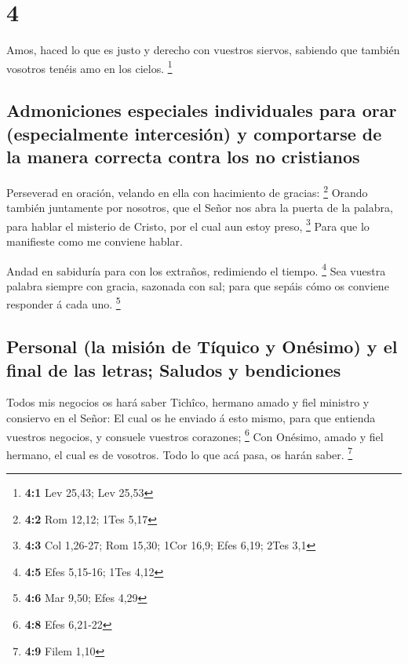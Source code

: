 \hypertarget{section-3}{%
\section{4}\label{section-3}}

 Amos, haced lo que es justo y derecho con vuestros siervos,
sabiendo que también vosotros tenéis amo en los cielos. \footnote{\textbf{4:1}
  Lev 25,43; Lev 25,53}

\hypertarget{admoniciones-especiales-individuales-para-orar-especialmente-intercesiuxf3n-y-comportarse-de-la-manera-correcta-contra-los-no-cristianos}{%
\subsection{Admoniciones especiales individuales para orar
(especialmente intercesión) y comportarse de la manera correcta contra
los no
cristianos}\label{admoniciones-especiales-individuales-para-orar-especialmente-intercesiuxf3n-y-comportarse-de-la-manera-correcta-contra-los-no-cristianos}}

 Perseverad en oración, velando en ella con hacimiento de
gracias: \footnote{\textbf{4:2} Rom 12,12; 1Tes 5,17} 
Orando también juntamente por nosotros, que el Señor nos abra la puerta
de la palabra, para hablar el misterio de Cristo, por el cual aun estoy
preso, \footnote{\textbf{4:3} Col 1,26-27; Rom 15,30; 1Cor 16,9; Efes
  6,19; 2Tes 3,1}  Para que lo manifieste como me conviene
hablar.

 Andad en sabiduría para con los extraños, redimiendo el
tiempo. \footnote{\textbf{4:5} Efes 5,15-16; 1Tes 4,12}  Sea
vuestra palabra siempre con gracia, sazonada con sal; para que sepáis
cómo os conviene responder á cada uno. \footnote{\textbf{4:6} Mar 9,50;
  Efes 4,29}

\hypertarget{personal-la-misiuxf3n-de-tuxedquico-y-onuxe9simo-y-el-final-de-las-letras-saludos-y-bendiciones}{%
\subsection{Personal (la misión de Tíquico y Onésimo) y el final de las
letras; Saludos y
bendiciones}\label{personal-la-misiuxf3n-de-tuxedquico-y-onuxe9simo-y-el-final-de-las-letras-saludos-y-bendiciones}}

 Todos mis negocios os hará saber Tichîco, hermano amado y
fiel ministro y consiervo en el Señor:  El cual os he
enviado á esto mismo, para que entienda vuestros negocios, y consuele
vuestros corazones; \footnote{\textbf{4:8} Efes 6,21-22} 
Con Onésimo, amado y fiel hermano, el cual es de vosotros. Todo lo que
acá pasa, os harán saber. \footnote{\textbf{4:9} Filem 1,10}

